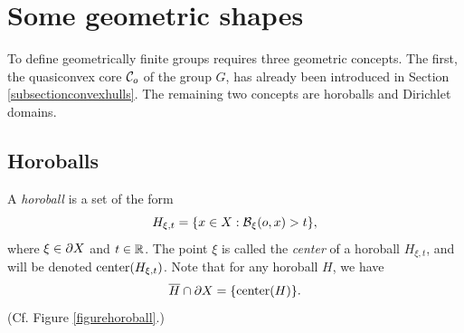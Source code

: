 \bigskip
\section{Some geometric shapes}
\label{subsectionGFgeometry}

To define geometrically finite groups requires three geometric concepts. The first, the quasiconvex core $\mathcal C_o$ of the group $G$, has already been introduced in Section \ref{subsectionconvexhulls}. The remaining two concepts are horoballs and Dirichlet domains.

\subsection{Horoballs}
\label{subsubsectionhoroballs}

\begin{definition}
\label{definitionhoroball}
A \emph{horoball} is a set of the form
\[
H_{\xi,t} = \{x\in X : \operatorname{\mathcal B}_\xi (o, x) > t\},
\]
where $\xi\in\partial X$ and $t\in\R$. The point $\xi$ is called the \emph{center} of a horoball $H_{\xi,t}$, and will be denoted $\operatorname{center}(H_{\xi,t})$. Note that for any horoball $H$, we have
\[
\overline H \cap \partial X = \{\operatorname{center}(H)\}.
\]
(Cf. Figure \ref{figurehoroball}.)
\end{definition}

